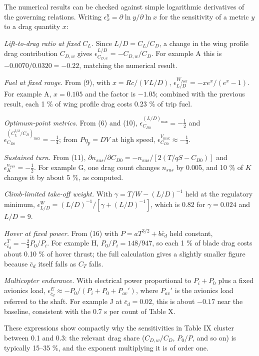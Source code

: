 \documentclass[10pt,a4paper,twocolumn]{article}
\begin{document}
The numerical results can be checked against simple logarithmic
derivatives of the governing relations. Writing
\(\epsilon_x^y = \partial\ln y/\partial\ln x\) for the sensitivity of a
metric \(y\) to a drag quantity \(x\):

\emph{Lift-to-drag ratio at fixed \(C_L\).} Since \(L/D=C_L/C_D\), a
change in the wing profile drag contribution \(C_{D,w}\) gives
\(\epsilon^{L/D}_{C_{D,w}} = -C_{D,w}/C_D\). For example A this is
\(-0.0070/0.0320 = -0.22\), matching the numerical result.

\emph{Fuel at fixed range.} From (9), with \(x = Rc/(V\,L/D)\),
\(\epsilon^{W_{fuel}}_{L/D} = -x e^x/(e^x-1)\). For example A,
\(x=0.105\) and the factor is \(-1.05\); combined with the previous
result, each 1 \% of wing profile drag costs 0.23 \% of trip fuel.

\emph{Optimum-point metrics.} From (6) and (10),
\(\epsilon^{(L/D)_{\max}}_{C_{D0}} = -\tfrac12\) and
\(\epsilon^{(C_L^{3/2}/C_D)_{\max}}_{C_{D0}} = -\tfrac14\); from
\(P\eta_p = DV\) at high speed,
\(\epsilon^{V_{\max}}_{C_{D0}} \approx -\tfrac13\).

\emph{Sustained turn.} From (11),
\(\partial n_{sus}/\partial C_{D0} = -n_{sus}/[2(T/qS - C_{D0})]\) and
\(\epsilon^{n_{sus}}_{K} = -\tfrac12\). For example G, one drag count
changes \(n_{sus}\) by 0.005, and 10 \% of \(K\) changes it by about 5
\%, as computed.

\emph{Climb-limited take-off weight.} With \(\gamma = T/W - (L/D)^{-1}\)
held at the regulatory minimum,
\(\epsilon^{W}_{L/D} = (L/D)^{-1}/[\gamma + (L/D)^{-1}]\), which is 0.82
for \(\gamma=0.024\) and \(L/D=9\).

\emph{Hover at fixed power.} From (16) with \(P = aT^{3/2} + b\bar c_d\)
held constant, \(\epsilon^{T}_{\bar c_d} = -\tfrac23 P_0/P_i\). For
example H, \(P_0/P_i = 148/947\), so each 1 \% of blade drag costs about
0.10 \% of hover thrust; the full calculation gives a slightly smaller
figure because \(\bar c_d\) itself falls as \(C_T\) falls.

\emph{Multicopter endurance.} With electrical power proportional to
\(P_i + P_0\) plus a fixed avionics load,
\(\epsilon^{E}_{\bar c_d} \approx -P_0/(P_i+P_0+P_{av}')\), where
\(P_{av}'\) is the avionics load referred to the shaft. For example J at
\(\bar c_d=0.02\), this is about \(-0.17\) near the baseline, consistent
with the 0.7 s per count of Table X.

These expressions show compactly why the sensitivities in Table IX
cluster between 0.1 and 0.3: the relevant drag share (\(C_{D,w}/C_D\),
\(P_0/P\), and so on) is typically 15--35 \%, and the exponent
multiplying it is of order one.
\end{document}
